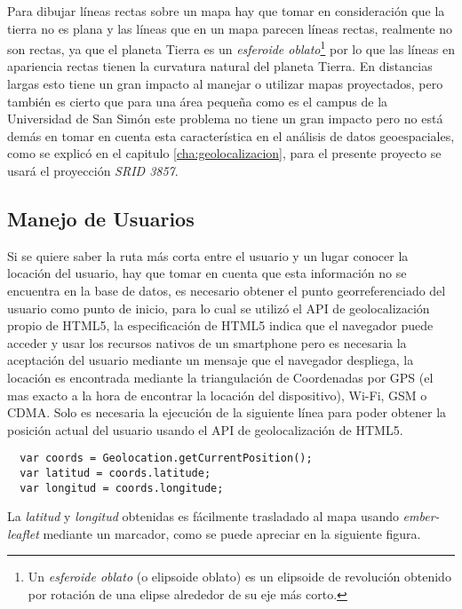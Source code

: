 Para dibujar líneas rectas sobre un mapa hay que tomar en consideración que la tierra no es plana y las líneas que en un mapa parecen líneas rectas, realmente no son rectas, ya que el planeta Tierra es un \emph{esferoide oblato}\footnote{Un \emph{esferoide oblato} (o elipsoide oblato) es un elipsoide de revolución obtenido por rotación de una elipse alrededor de su eje más corto.} por lo que las líneas en apariencia rectas tienen la curvatura natural del planeta Tierra. En distancias largas esto tiene un gran impacto al manejar o utilizar mapas proyectados, pero también es cierto que para una área pequeña como es el campus de la Universidad de San Simón este problema no tiene un gran impacto pero no está demás en tomar en cuenta esta característica en el análisis de datos geoespaciales, como se explicó en el capitulo \ref{cha:geolocalizacion}, para el presente proyecto se usará el proyección \emph{SRID 3857}.\\




\subsection{Manejo de Usuarios}
\label{sub:Manejo de Usuarios}

Si se quiere saber la ruta más corta entre el usuario y un lugar conocer la locación del usuario, hay que tomar en cuenta que esta información no se encuentra en la base de datos, es necesario obtener el punto georreferenciado del usuario como punto de inicio, para lo cual se utilizó el API de geolocalización propio de HTML5, la especificación de HTML5 indica que el navegador puede acceder y usar los recursos nativos de un smartphone pero es necesaria la aceptación del usuario mediante un mensaje que el navegador despliega, la locación es encontrada mediante la triangulación de Coordenadas por GPS (el mas exacto a la hora de encontrar la locación del dispositivo), Wi-Fi, GSM o CDMA. Solo es necesaria la ejecución de la siguiente línea para poder obtener la posición actual del usuario usando el API de geolocalización de HTML5. \\

\begin{verbatim}
  var coords = Geolocation.getCurrentPosition();
  var latitud = coords.latitude;
  var longitud = coords.longitude;
\end{verbatim}

La \emph{latitud} y \emph{longitud} obtenidas es fácilmente trasladado al mapa usando \emph{ember-leaflet} mediante un marcador, como se puede apreciar en la siguiente figura.

